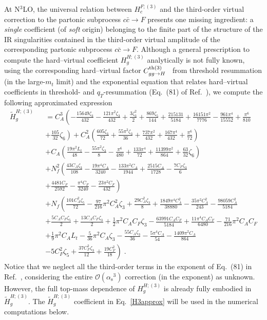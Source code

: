 \documentclass[12pt]{article}
\def\beeq{\begin{eqnarray}}
\def\eeeq{\end{eqnarray}}
\def\nn{\nonumber}
\DeclareRobustCommand{\as}{\ensuremath{\alpha_{\mathrm{s}}}}
\newcommand\f[2]{\frac{#1}{#2}}
\def\to{\rightarrow}
\DeclareRobustCommand{\qt}{q_T}
\begin{document}
At N$^{3}$LO, the universal relation between $H^{F;(3)}_{c}$ and the third-order virtual correction to the partonic subprocess $c{\bar c}\to F$ presents one missing ingredient: a {\em single} coefficient (of {\em soft} origin) belonging to the finite part of the structure of the IR singularities contained in the
third-order virtual amplitude of the corresponding partonic subprocess $c{\bar c}\to F$. Although a general prescription to compute the hard--virtual coefficient $H^{H;(3)}_{g}$ analytically is not fully known, using the corresponding hard--virtual factor $C^{{\rm th}(3)}_{gg\to H}$~\cite{Catani:2014uta} from threshold resummation (in the large-$m_t$ limit) and the exponential equation that relates hard--virtual coefficients in threshold- and $\qt$-resummation (Eq.~(81) of Ref.~\cite{Catani:2013tia}), we compute the following approximated expression
\beeq
\label{H3approx}
\widetilde{H}^{H;(3)}_{g}&&\!\!\!\!\!\!\!\!=C_{A}^{3}\left(-\frac{15649 \zeta_{3}}{432}-\frac{121 \pi ^2 \zeta_{3}}{432}+\frac{3
   \zeta_{3}^2}{2}+\frac{869 \zeta_{ 5}}{144}+\frac{215131}{5184}+\frac{16151 \pi ^2}{7776}-\frac{961
   \pi ^4}{15552}+\frac{\pi ^6}{810}\right.\nn\\
   &&\left.+\f{105}{32} \zeta_{6}\right)
  +  C_{A}^{2}\left(\frac{605 \zeta_{ 3}}{72}+\frac{55 \pi ^2 \zeta_{ 3}}{36}+\frac{737 \pi ^2}{432}+\frac{167 \pi ^4}{432}+\frac{\pi
   ^6}{72}   \right) \nn\\
   &&+ C_{A}\left( \frac{19 \pi ^2  L_{t}}{48}-\frac{55 \pi ^2 \zeta _{3}}{8}-\frac{\pi ^6}{480}+\frac{133 \pi ^4}{72}+\frac{11399
   \pi ^2}{864}  + \f{63}{32} \zeta_{6}    \right)\nn\\
   && + N_{f}^{2} \left( \frac{43 C_{A} \zeta_{ 3}}{108}-\frac{19 \pi ^4 C_{A}}{3240}-\frac{133 \pi ^2 C_{A}}{1944}+\frac{2515
   C_{A}}{1728}-\frac{7 C_{F} \zeta_{ 3}}{6}\right. \nn\\
   &&+\left. \frac{4481 C_{F}}{2592}-\frac{\pi ^4
   C_{F}}{3240}-\frac{23 \pi ^2 C_{F}}{432} \right)\nn\\
   && + N_{f} \left(
    \frac{101 C_{A}^2 \zeta_{5}}{72}-\frac{97}{216} \pi ^2 C_{A}^2 \zeta_{3}+\frac{29 C_{A}^2 \zeta_{3}}{8}+\frac{1849 \pi ^4 C_{A}^2}{38880}-\frac{35 \pi ^2 C_{A}^2}{243}-\frac{98059
  C_{A}^2}{5184}\right.\nn\\
   &&+\frac{5 C_{A} C_{F} \zeta _{5}}{2}+\frac{13 C_{A} C_{F} \zeta
   _{3}}{2}+\frac{1}{2} \pi ^2 C_{A} C_{F} \zeta _{3}-\frac{63991 C_{A} C_{F}}{5184}+\frac{11 \pi ^4
   C_{A} C_{F}}{6480}-\frac{71}{216} \pi ^2 C_{A} C_{F}\nn\\
   &&+\frac{1}{9} \pi ^2 C_{A}
   L_{t}-\frac{5}{36} \pi ^2 C_{A} \zeta _{3}-\frac{55 C_{A} \zeta_{ 3}}{36}-\frac{5 \pi ^4
   C_{A}}{54}-\frac{1409 \pi ^2 C_{A}}{864}\nn\\
   && \left. -5 C_{F}^2 \zeta_{ 5}+\frac{37 C_{F}^2 \zeta
   _{3}}{12}+\frac{19 C_{F}^2}{18}\right)\;.
\eeeq
Notice that we neglect all the third-order terms in the exponent of Eq.~(81) in Ref.~\cite{Catani:2013tia}, considering the entire $\mathcal{O}(\as^{3})$ correction (in the exponent) as unknown. However, the full top-mass dependence of $H^{H;(3)}_g$ is already fully embodied in $\widetilde{H}^{H;(3)}_{g}$.
The $\widetilde{H}^{H;(3)}_{g}$ coefficient in Eq.~\eqref{H3approx} will be used in the numerical computations below.
\end{document}
